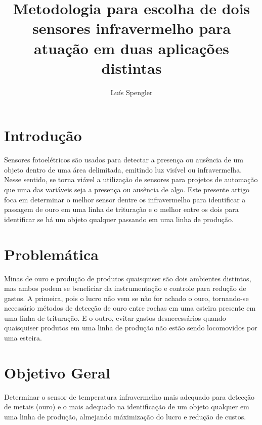 \documentclass{article}
\title{Metodologia para escolha de dois sensores infravermelho para atuação em duas aplicações distintas}
\date{}
\author[1]{Luís Spengler}
\affil[1]{Instituto Federal de Educação, Ciência e Tecnologia de Mato Grosso do Sul}
\begin{document}
\maketitle

\section{Introdução}
Sensores fotoelétricos são usados para detectar a presença ou ausência de um objeto dentro de uma área delimitada, emitindo luz visível ou infravermelha. 
Nesse sentido, se torna viável a utilização de sensores para projetos de automação que uma das variáveis seja a presença ou ausência de algo.
Este presente artigo foca em determinar o melhor sensor dentre os infravermelho para identificar a passagem de ouro em uma linha de trituração e o melhor entre os dois para identificar se há um objeto qualquer passando em uma linha de produção.
\section{Problemática}
Minas de ouro e produção de produtos quaisquiser são dois ambientes distintos, mas ambos podem se beneficiar da instrumentação e controle para redução de gastos. A primeira, pois o lucro não vem se não for achado o ouro, tornando-se necessário métodos de detecção de ouro entre rochas em uma esteira presente em uma linha de trituração. E o outro, evitar gastos desnecessários quando quaisquiser produtos em uma linha de produção não estão sendo locomovidos por uma esteira.

\section{Objetivo Geral}
Determinar o sensor de temperatura infravermelho mais adequado para detecção de metais (ouro) e o mais adequado na identificação de um objeto qualquer em uma linha de produção, almejando máximização do lucro e redução de custos.
\end{document}
